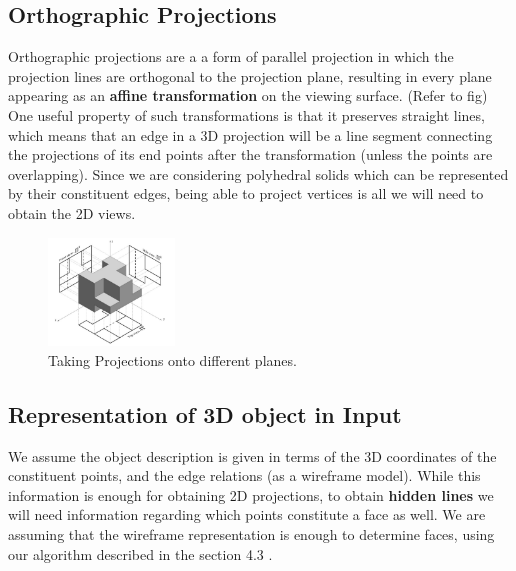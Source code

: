 \documentclass[12pt,a4paper]{article}
\begin{document}
\subsection{Orthographic Projections}

Orthographic projections are a a form of parallel projection in which the projection lines are orthogonal to the
projection plane, resulting in every plane appearing as an \textbf{affine transformation} on the viewing surface. (Refer to fig) One useful property of such transformations is that it preserves straight lines, which means that an edge  in a 3D projection will be a line segment connecting the projections of its end points after the transformation (unless the points are overlapping). Since we are considering polyhedral solids which can be represented by their constituent edges, being able to project vertices is all we will need to obtain the 2D views.  \newline


\begin{figure}
\centering
\includegraphics[width=0.3\textwidth]{Orthographic_simple.png}
\caption{\label{fig:simpleortho}Taking Projections onto different planes.}
\end{figure}



\subsection{Representation of 3D object in Input}
We assume the object description is given in terms of the 3D coordinates of the constituent points, and the edge relations (as a wireframe model). While this information is enough for obtaining 2D projections, to obtain {\textbf{hidden lines}} we will need information regarding which points constitute a face as well. We are assuming that the wireframe representation is enough to determine faces, using our algorithm described in the  section 4.3 .
\end{document}
